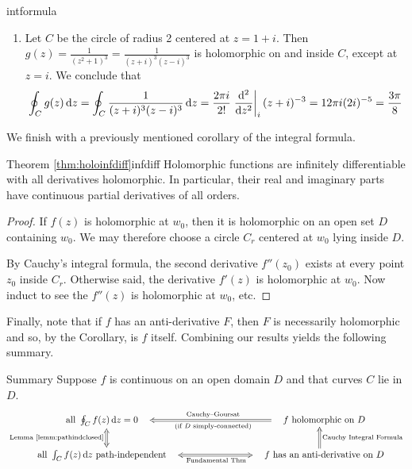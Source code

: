 \begin{examples}{}{intformula}
\begin{enumerate}
	  \item Let $C$ be the circle of radius 2 centered at $z=1+i$. Then $g(z)=\frac 1{(z^2+1)^3}=\frac 1{(z+i)^3(z-i)^3}$ is holomorphic on and inside $C$, except at $z=i$. We conclude that
	  \[
	  	\oint_Cg(z)\,\dz=\oint_C\frac 1{(z+i)^3(z-i)^3}\,\dz=\frac{2\pi i}{2!}\diffat[^2]{z^2}{i}(z+i)^{-3} =12\pi i(2i)^{-5} =\frac{3\pi}{8}
	  \]
	\end{enumerate}
\end{examples}

We finish with a previously mentioned corollary of the integral formula.

\begin{cor}{Theorem \ref{thm:holoinfdiff}}{infdiff}
	Holomorphic functions are infinitely differentiable with all derivatives holomorphic. In particular, their real and imaginary parts have continuous partial derivatives of all orders.
\end{cor}


\begin{proof}
	If $f(z)$ is holomorphic at $w_0$, then it is holomorphic on an open set $D$ containing $w_0$. We may therefore choose a circle $C_r$ centered at $w_0$ lying inside $D$.\par
	By Cauchy's integral formula, the second derivative $f''(z_0)$ exists at every point $z_0$ inside $C_r$. Otherwise said, the derivative $f'(z)$ is holomorphic at $w_0$.\smallbreak
	Now induct to see the $f''(z)$ is holomorphic at $w_0$, etc.
\end{proof}

\goodbreak

Finally, note that if $f$ has an anti-derivative $F$, then $F$ is necessarily holomorphic and so, by the Corollary, is $f$ itself. Combining our results yields the following summary.

\begin{thm*}{Summary}
	Suppose $f$ is continuous on an open domain $D$ and that curves $C$ lie in $D$.
	\[
		\xymatrix @R20pt @C80pt{%
			\text{all}\ \oint_C f(z)\,\dz=0\quad \ar@{<=>}[d]_{\text{Lemma \ref*{lemm:pathindclosed}}}  & \quad f\ \text{holomorphic on $D$} \ar@{=>}[l]_{\text{Cauchy--Goursat}}^{\text{(if $D$ simply-connected)}}\\
			\text{all}\ \int_C f(z)\,\dz\ \text{path-independent} \quad \ar@{<=>}[r]_{\ \ \text{Fundamental Thm}} & \quad f\ \text{has an anti-derivative on $D$} \ar@{=>}[u]_{\text{Cauchy Integral Formula}} 
		}
	\]
\end{thm*}




